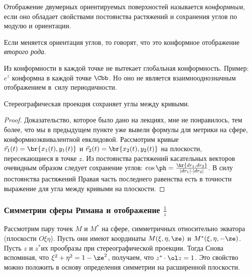 \documentclass[a4paper]{article}
\begin{document}
\begin{df}
Отображение двумерных  ориентируемых поверхностей называется \emph{конформным}, если оно обладает свойствами постоянства
растяжений и сохранения углов по модулю и ориентации.
\end{df}

Если меняется ориентация углов, то говорят, что это конформное отображение \emph{второго рода}.

\begin{note}
Из конформности в каждой точке не вытекает глобальная конформность. Пример: $e^z$ конформна в каждой точке $\Cbb$.
Но оно не является взаимно\д однозначным отображением в~силу периодичности.
\end{note}

\begin{theorem}
Стереографическая проекция сохраняет углы между кривыми.
\end{theorem}
\begin{proof}
Доказательство, которое было дано на лекциях, мне не понравилось, тем более, что мы в предыдущем пункте уже
вывели формулы для метрики на сфере, конформно\д эквивалентной евклидовой. Рассмотрим кривые $\vec r_1(t) = \br{x_1(t),y_1(t)}$ и
$\vec r_2(t) = \br{x_2(t),y_2(t)}$ на плоскости, пересекающиеся в точке $z$. Из постоянства растяжений касательных векторов очевидным образом следует сохранение углов:
$\cos\ph = \frac{\hr{dr_1, dr_2}}{|dr_1| \cdot |dr_2|}$. В силу постоянства растяжений
Правая часть последнего равенства есть в точности выражение для угла между кривыми на плоскости.
\end{proof}

\subsubsection{Симметрии сферы Римана и отображение $\frac{1}{z}$}

Рассмотрим пару точек $M$ и $M^*$ на сфере, симметричных относительно экватора (плоскости $O\xi\eta$). Пусть
они имеют координаты $M(\xi,\eta,\ze)$ и $M^*(\xi,\eta,-\ze)$. Пусть $z$ и $z^*$\т их прообразы при стереографической
проекции. Тогда
Снова вспоминая, что $\xi^2+\eta^2 = 1-\ze^2$, получаем, что $z^*\cdot \ol z = 1$.
Это свойство можно положить в основу определения симметрии на расширенной плоскости.
\end{document}
